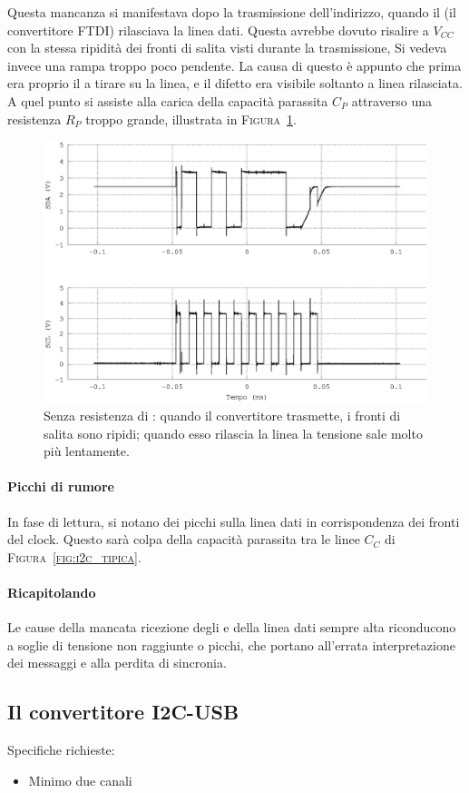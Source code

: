 Questa mancanza si manifestava dopo la trasmissione dell'indirizzo,
quando il \master{} (il convertitore {FTDI})
rilasciava la linea dati.
Questa avrebbe dovuto risalire a $V_{CC}$ con la stessa ripidità
dei fronti di salita visti durante la trasmissione,
Si vedeva invece una rampa troppo poco pendente.
La causa di questo è appunto che prima era proprio il \master{}
a tirare su la linea, e il difetto era visibile soltanto
a linea rilasciata. A quel punto si assiste
alla carica della capacità parassita $C_P$
attraverso una resistenza $R_P$ troppo grande,
illustrata in \textsc{Figura~\ref{fig:i2c_rampa}}.\\

\begin{figure}
\centering
  \includegraphics[width=.5\textwidth]{RampaNero}
	\caption{Senza resistenza di \pullup{}: quando il convertitore trasmette, i fronti di salita sono ripidi; quando esso rilascia la linea la tensione sale molto più lentamente.}
    \label{fig:i2c_rampa}
\end{figure}

\paragraph{Picchi di rumore}
In fase di lettura, si notano dei picchi sulla linea dati
in corrispondenza dei fronti del clock.
Questo sarà colpa della capacità parassita
tra le linee $C_C$ di \textsc{Figura~\ref{fig:i2c_tipica}}.\\

\paragraph{Ricapitolando}
Le cause della mancata ricezione degli \Ack{}
e della linea dati sempre alta
riconducono a soglie di tensione non raggiunte o picchi,
che portano all'errata interpretazione dei messaggi
e alla perdita di sincronia.

\subsection{Il convertitore I2C-USB}
    Specifiche richieste:
	\begin{itemize}
	  \item Minimo due canali
	\end{itemize}

